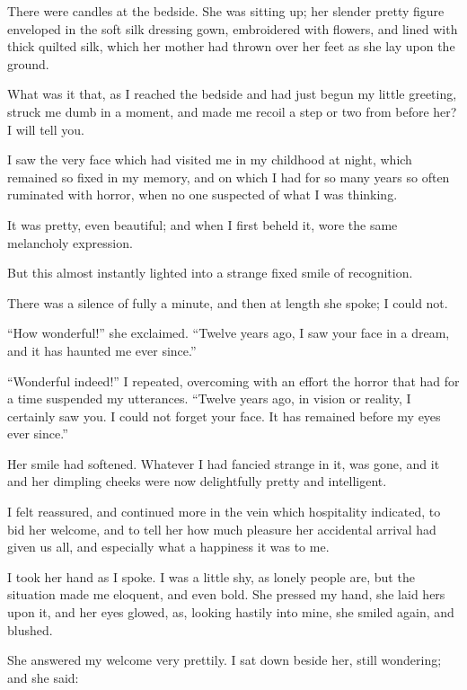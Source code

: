 \documentclass[11pt,twoside,makeidx,hidelinks,]{memoir}
\begin{document}
There were candles at the bedside. She was sitting up; her slender
pretty figure enveloped in the soft silk dressing gown, embroidered with
flowers, and lined with thick quilted silk, which her mother had thrown
over her feet as she lay upon the ground.

What was it that, as I reached the bedside and had just begun my little
greeting, struck me dumb in a moment, and made me recoil a step or two
from before her? I will tell you.

I saw the very face which had visited me in my childhood at night, which
remained so fixed in my memory, and on which I had for so many years so
often ruminated with horror, when no one suspected of what I
was thinking.

It was pretty, even beautiful; and when I first beheld it, wore the
same melancholy expression.

But this almost instantly lighted into a strange fixed smile of
recognition.

There was a silence of fully a minute, and then at length she spoke; I
could not.

``How wonderful!'' she exclaimed. ``Twelve years ago, I saw your face in a
dream, and it has haunted me ever since.''

``Wonderful indeed!'' I repeated, overcoming with an effort the horror
that had for a time suspended my utterances. ``Twelve years ago, in
vision or reality, I certainly saw you. I could not forget your face. It
has remained before my eyes ever since.''

Her smile had softened. Whatever I had fancied strange in it, was gone,
and it and her dimpling cheeks were now delightfully pretty and
intelligent.

I felt reassured, and continued more in the vein which hospitality
indicated, to bid her welcome, and to tell her how much pleasure her
accidental arrival had given us all, and especially what a happiness it
was to me.

I took her hand as I spoke. I was a little shy, as lonely people are,
but the situation made me eloquent, and even bold. She pressed my hand,
she laid hers upon it, and her eyes glowed, as, looking hastily into
mine, she smiled again, and blushed.

She answered my welcome very prettily. I sat down beside her, still
wondering; and she said:
\end{document}

